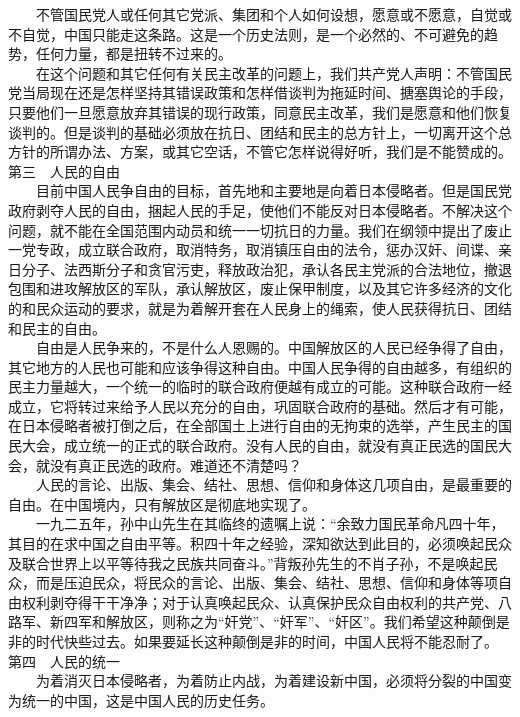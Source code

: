 \documentclass[cn,11pt,chinese]{elegantbook}
\begin{document}
　　不管国民党人或任何其它党派、集团和个人如何设想，愿意或不愿意，自觉或不自觉，中国只能走这条路。这是一个历史法则，是一个必然的、不可避免的趋势，任何力量，都是扭转不过来的。\\
　　在这个问题和其它任何有关民主改革的问题上，我们共产党人声明：不管国民党当局现在还是怎样坚持其错误政策和怎样借谈判为拖延时间、搪塞舆论的手段，只要他们一旦愿意放弃其错误的现行政策，同意民主改革，我们是愿意和他们恢复谈判的。但是谈判的基础必须放在抗日、团结和民主的总方针上，一切离开这个总方针的所谓办法、方案，或其它空话，不管它怎样说得好听，我们是不能赞成的。\\
第三　人民的自由\\
　　目前中国人民争自由的目标，首先地和主要地是向着日本侵略者。但是国民党政府剥夺人民的自由，捆起人民的手足，使他们不能反对日本侵略者。不解决这个问题，就不能在全国范围内动员和统一一切抗日的力量。我们在纲领中提出了废止一党专政，成立联合政府，取消特务，取消镇压自由的法令，惩办汉奸、间谍、亲日分子、法西斯分子和贪官污吏，释放政治犯，承认各民主党派的合法地位，撤退包围和进攻解放区的军队，承认解放区，废止保甲制度，以及其它许多经济的文化的和民众运动的要求，就是为着解开套在人民身上的绳索，使人民获得抗日、团结和民主的自由。\\
　　自由是人民争来的，不是什么人恩赐的。中国解放区的人民已经争得了自由，其它地方的人民也可能和应该争得这种自由。中国人民争得的自由越多，有组织的民主力量越大，一个统一的临时的联合政府便越有成立的可能。这种联合政府一经成立，它将转过来给予人民以充分的自由，巩固联合政府的基础。然后才有可能，在日本侵略者被打倒之后，在全部国土上进行自由的无拘束的选举，产生民主的国民大会，成立统一的正式的联合政府。没有人民的自由，就没有真正民选的国民大会，就没有真正民选的政府。难道还不清楚吗？\\
　　人民的言论、出版、集会、结社、思想、信仰和身体这几项自由，是最重要的自由。在中国境内，只有解放区是彻底地实现了。\\
　　一九二五年，孙中山先生在其临终的遗嘱上说：“余致力国民革命凡四十年，其目的在求中国之自由平等。积四十年之经验，深知欲达到此目的，必须唤起民众及联合世界上以平等待我之民族共同奋斗。”背叛孙先生的不肖子孙，不是唤起民众，而是压迫民众，将民众的言论、出版、集会、结社、思想、信仰和身体等项自由权利剥夺得干干净净；对于认真唤起民众、认真保护民众自由权利的共产党、八路军、新四军和解放区，则称之为“奸党”、“奸军”、“奸区”。我们希望这种颠倒是非的时代快些过去。如果要延长这种颠倒是非的时间，中国人民将不能忍耐了。\\
第四　人民的统一\\
　　为着消灭日本侵略者，为着防止内战，为着建设新中国，必须将分裂的中国变为统一的中国，这是中国人民的历史任务。\\
\end{document}

